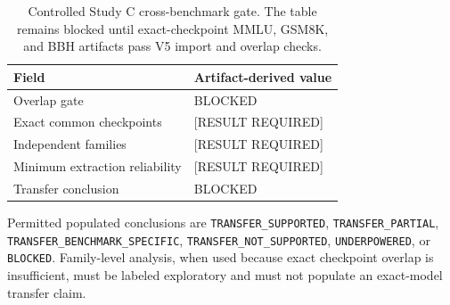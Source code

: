 \providecommand{\VECrossGate}{BLOCKED}
\providecommand{\VETransferConclusion}{BLOCKED}
\providecommand{\VECommonModels}{[RESULT REQUIRED]}
\providecommand{\VECommonFamilies}{[RESULT REQUIRED]}
\providecommand{\VEMinExtractionReliability}{[RESULT REQUIRED]}

\begin{table}[t]
  \centering
  \caption{Controlled Study C cross-benchmark gate. The table remains blocked until
  exact-checkpoint MMLU, GSM8K, and BBH artifacts pass V5 import and overlap checks.}
  \label{tab:cross-benchmark-v5}
  \begin{tabular}{ll}
    \toprule
    Field & Artifact-derived value \\
    \midrule
    Overlap gate & \VECrossGate \\
    Exact common checkpoints & \VECommonModels \\
    Independent families & \VECommonFamilies \\
    Minimum extraction reliability & \VEMinExtractionReliability \\
    Transfer conclusion & \VETransferConclusion \\
    \bottomrule
  \end{tabular}
\end{table}

Permitted populated conclusions are \texttt{TRANSFER\_SUPPORTED},
\texttt{TRANSFER\_PARTIAL}, \texttt{TRANSFER\_BENCHMARK\_SPECIFIC},
\texttt{TRANSFER\_NOT\_SUPPORTED}, \texttt{UNDERPOWERED}, or
\texttt{BLOCKED}. Family-level analysis, when used because exact checkpoint
overlap is insufficient, must be labeled exploratory and must not populate an
exact-model transfer claim.
